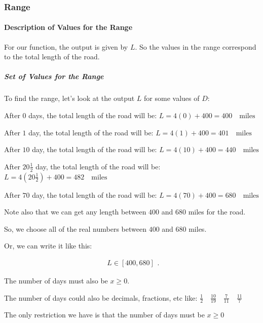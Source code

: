 \begin{example}

  \subsubsection{Range}
  \label{sub_sub_sec:range}
  
  \paragraph{Description of Values for the Range}
  \label{par:description_of_values_for_the_range}
  
  For our function, the output is given by $L$.
  So the values in the range correspond to the total length of the road.

  \subparagraph{Set of Values for the Range}
  \label{sub_par:set_of_values_for_the_range}
  
  To find the range, let's look at the output $L$ for some values of $D$:

  After $0$ days, the total length of the road will be:
  $L = 4(0) + 400 = 400 \quad \textrm{miles}$ 

  After $1$ day, the total length of the road will be:
  $L = 4(1) + 400 = 401 \quad \textrm{miles}$

  After $10$ day, the total length of the road will be:
  $L = 4(10) + 400 = 440 \quad \textrm{miles}$
  
  After $20 \frac{1}{2}$ day, the total length of the road will be:
  $L = 4(20 \frac{1}{2}) + 400 = 482 \quad \textrm{miles}$

  After $70$ day, the total length of the road will be:
  $L = 4(70) + 400 = 680 \quad \textrm{miles}$

  Note also that we can get any length between $400$ and $680$ miles for the
  road.

  So, we choose all of the real numbers between $400$ and $680$ miles.

  Or, we can write it like this:

  \begin{equation}
    \label{eqt:values_for_the_range}
    \begin{split}
      L \in [400, 680]
    \end{split}
  .\end{equation}
  
  
  
\end{example}

\begin{note}
  \label{nte:set_of_values_for_the_domain}

  The number of days must also be $x \ge 0$.

  The number of days could also be decimals, fractions, etc like:
  $\frac{1}{2} \quad \frac{10}{19} \quad \frac{7}{11} \quad \frac{11}{7}$

  The only restriction we have is that the number of days must be $x \ge 0$
\end{note}

\newpage
